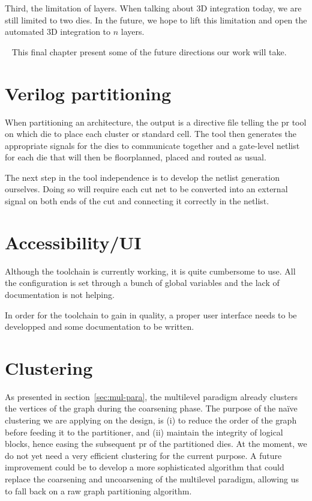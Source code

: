 \documentclass[11pt,a4paper]{report} %
\theoremstyle{customdef}
\begin{document}
Third, the limitation of layers.
When talking about 3D integration today, we are still limited to two dies.
In the future, we hope to lift this limitation and open the automated 3D integration to $n$ layers.

~\newline{}
This final chapter present some of the future directions our work will take.



\section{Verilog partitioning}
When partitioning an architecture, the output is a directive file telling the \gls{pr} tool on which die to place each cluster or standard cell.
The tool then generates the appropriate signals for the dies to communicate together and a gate-level netlist for each die that will then be floorplanned, placed and routed as usual.

The next step in the tool independence is to develop the netlist generation ourselves.
Doing so will require each cut net to be converted into an external signal on both ends of the cut and connecting it correctly in the netlist.



\section{Accessibility/UI}
Although the toolchain is currently working, it is quite cumbersome to use.
All the configuration is set through a bunch of global variables and the lack of documentation is not helping.

In order for the toolchain to gain in quality, a proper user interface needs to be developped and some documentation to be written.




\section{Clustering}
As presented in section~\ref{sec:mul-para}, the multilevel paradigm already clusters the vertices of the graph during the coarsening phase.
The purpose of the naïve clustering we are applying on the design, is (i) to reduce the order of the graph before feeding it to the partitioner, and (ii) maintain the integrity of logical blocks, hence easing the subsequent \gls{pr} of the partitioned dies.
At the moment, we do not yet need a very efficient clustering for the current purpose.
A future improvement could be to develop a more sophisticated algorithm that could replace the coarsening and uncoarsening of the multilevel paradigm, allowing us to fall back on a raw graph partitioning algorithm.
\end{document}
